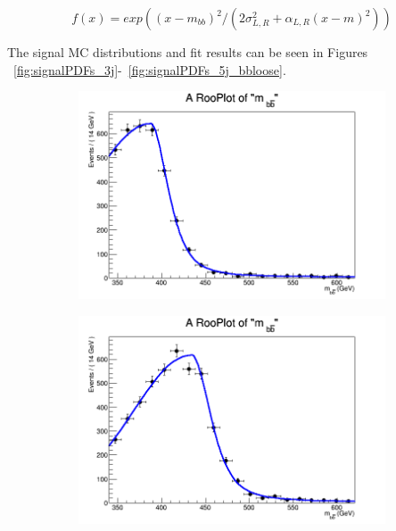 \begin{equation}
f(x) = exp((x-m_{bb})^2 / (2\sigma^2_{L,R} + \alpha_{L,R}(x-m)^2))
\end{equation}

The signal MC distributions and fit results can be seen in Figures
~\ref{fig:signalPDFs_3j}-~\ref{fig:signalPDFs_5j_bbloose}. 


\begin{figure}[phtb!]
  \begin{center}
  \begin{subfigure}[$m_{A}=400$ GeV]{0.4\textwidth}\includegraphics[width=\textwidth]{FitResults/images/fitMC_bAbb400_1.png}\end{subfigure}
  \begin{subfigure}[$m_{A}=450$ GeV]{0.4\textwidth}\includegraphics[width=\textwidth]{FitResults/images/fitMC_bAbb450_1.png}\end{subfigure}

\end{center}
\end{figure}

